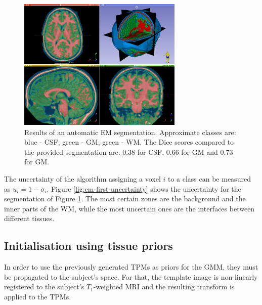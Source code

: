 \begin{figure}
  \centering
  \includegraphics[width=0.7\textwidth]{figures/em_first}
  \caption{Results of an automatic EM segmentation. Approximate classes are: blue - CSF; green - GM; green - WM. The Dice scores compared to the provided segmentation are: 0.38 for CSF, 0.66 for GM and 0.73 for GM.}
  \label{fig:em-first}
\end{figure}

The uncertainty of the algorithm assigning a voxel $i$ to a class can be measured as $u_i = 1 - \sigma_i$. Figure \ref{fig:em-first-uncertainty} shows the uncertainty for the segmentation of Figure \ref{fig:em-first}. The most certain zones are the background and the inner parts of the WM, while the most uncertain ones are the interfaces between different tissues.




\subsection{Initialisation using tissue priors}
In order to use the previously generated TPMs as priors for the GMM, they must be propagated to the subject's space. For that, the template image is non-linearly registered to the subject's $T_1$-weighted MRI and the resulting transform is applied to the TPMs.


